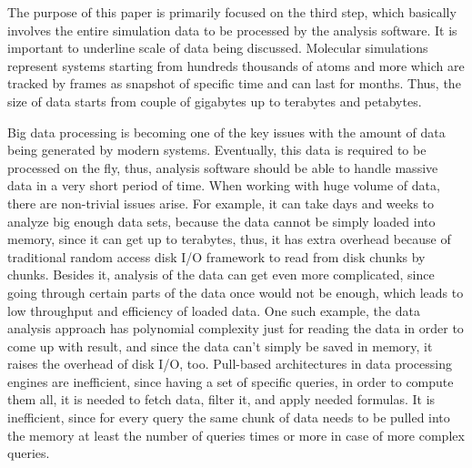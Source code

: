 \documentclass[12pt,letterpaper]{report}
\begin{document}
The purpose of this paper is primarily focused on the third step, which basically involves the entire simulation data to be processed by the analysis software. It is important to underline scale of data being discussed. Molecular simulations represent systems starting from hundreds thousands of atoms and more which are tracked by frames as snapshot of specific time and can last for months. Thus, the size of data starts from couple of gigabytes up to terabytes and petabytes.

Big data processing is becoming one of the key issues with the amount of data being generated by modern systems. Eventually, this data is required to be processed on the fly, thus, analysis software should be able to handle massive data in a very short period of time. When working with huge volume of data, there are non-trivial issues arise. For example, it can take days and weeks to analyze big enough data sets, because the data cannot be simply loaded into memory, since it can get up to terabytes, thus, it has extra overhead because of traditional random access disk I/O framework to read from disk chunks by chunks. Besides it, analysis of the data can get even more complicated, since going through certain parts of the data once would not be enough, which leads to low throughput and efficiency of loaded data. One such example, the data analysis approach has polynomial complexity just for reading the data in order to come up with result, and since the data can't simply be saved in memory, it raises the overhead of disk I/O, too. Pull-based architectures in data processing engines are inefficient, since having a set of specific queries, in order to compute them all, it is needed to fetch data, filter it, and apply needed formulas. It is inefficient, since for every query the same chunk of data needs to be pulled into the memory at least the number of queries times or more in case of more complex queries.
\end{document}
